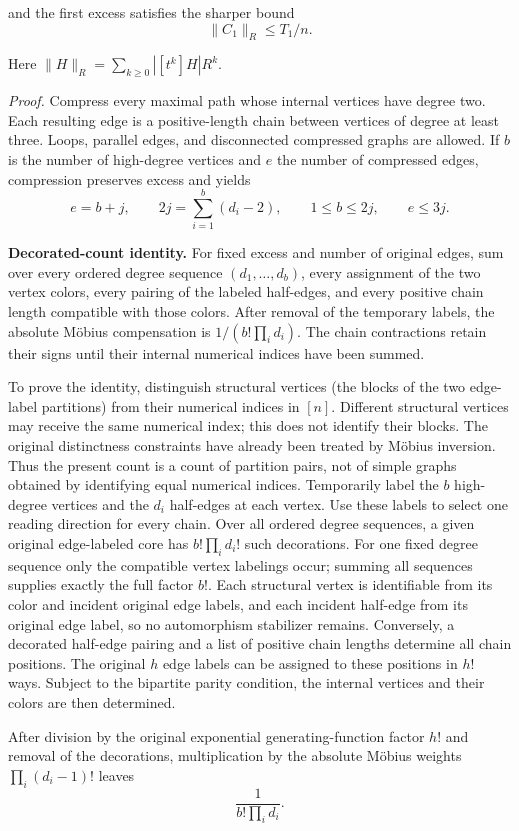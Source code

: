 \documentclass[11pt,a4paper]{article}
\begin{document}
and the first excess satisfies the sharper bound
\[\|C_1\|_R\le T_1/n.\]

Here \(\|H\|_R=\sum_{k\ge0}|[t^k]H|R^k\).

\emph{Proof.} Compress every maximal path whose internal vertices have degree two. Each resulting edge is a positive-length chain between vertices of degree at least three. Loops, parallel edges, and disconnected compressed graphs are allowed. If \(b\) is the number of high-degree vertices and \(e\) the number of compressed edges, compression preserves excess and yields
\[e=b+j,\qquad
2j=\sum_{i=1}^b(d_i-2),\qquad
1\le b\le2j,\qquad e\le3j.\]

\textbf{Decorated-count identity.} For fixed excess and number of original edges, sum over every ordered degree sequence \((d_1,\ldots,d_b)\), every assignment of the two vertex colors, every pairing of the labeled half-edges, and every positive chain length compatible with those colors. After removal of the temporary labels, the absolute Möbius compensation is \(1/(b!\prod_i d_i)\). The chain contractions retain their signs until their internal numerical indices have been summed.

To prove the identity, distinguish structural vertices (the blocks of the two edge-label partitions) from their numerical indices in \([n]\). Different structural vertices may receive the same numerical index; this does not identify their blocks. The original distinctness constraints have already been treated by Möbius inversion. Thus the present count is a count of partition pairs, not of simple graphs obtained by identifying equal numerical indices. Temporarily label the \(b\) high-degree vertices and the \(d_i\) half-edges at each vertex. Use these labels to select one reading direction for every chain. Over all ordered degree sequences, a given original edge-labeled core has \(b!\prod_i d_i!\) such decorations. For one fixed degree sequence only the compatible vertex labelings occur; summing all sequences supplies exactly the full factor \(b!\). Each structural vertex is identifiable from its color and incident original edge labels, and each incident half-edge from its original edge label, so no automorphism stabilizer remains. Conversely, a decorated half-edge pairing and a list of positive chain lengths determine all chain positions. The original \(h\) edge labels can be assigned to these positions in \(h!\) ways. Subject to the bipartite parity condition, the internal vertices and their colors are then determined.

After division by the original exponential generating-function factor \(h!\) and removal of the decorations, multiplication by the absolute Möbius weights \(\prod_i(d_i-1)!\) leaves
\[\frac1{b!\prod_i d_i}.\]
\end{document}

